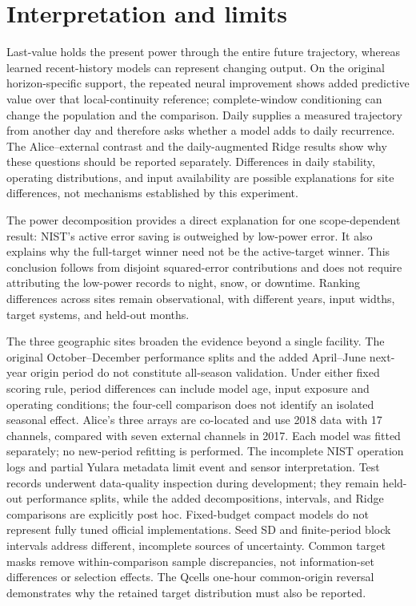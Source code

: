 \documentclass[aip,reprint,floatfix,amsmath,amssymb]{revtex4-2}
\begin{document}
\section{Interpretation and limits}
Last-value holds the present power through the entire future trajectory, whereas learned recent-history models can represent changing output. On the original horizon-specific support, the repeated neural improvement shows added predictive value over that local-continuity reference; complete-window conditioning can change the population and the comparison. Daily supplies a measured trajectory from another day and therefore asks whether a model adds to daily recurrence. The Alice--external contrast and the daily-augmented Ridge results show why these questions should be reported separately. Differences in daily stability, operating distributions, and input availability are possible explanations for site differences, not mechanisms established by this experiment.

The power decomposition provides a direct explanation for one scope-dependent result: NIST's active error saving is outweighed by low-power error. It also explains why the full-target winner need not be the active-target winner. This conclusion follows from disjoint squared-error contributions and does not require attributing the low-power records to night, snow, or downtime. Ranking differences across sites remain observational, with different years, input widths, target systems, and held-out months.

The three geographic sites broaden the evidence beyond a single facility. The original October--December performance splits and the added April--June next-year origin period do not constitute all-season validation. Under either fixed scoring rule, period differences can include model age, input exposure and operating conditions; the four-cell comparison does not identify an isolated seasonal effect. Alice's three arrays are co-located and use 2018 data with 17 channels, compared with seven external channels in 2017. Each model was fitted separately; no new-period refitting is performed. The incomplete NIST operation logs and partial Yulara metadata limit event and sensor interpretation. Test records underwent data-quality inspection during development; they remain held-out performance splits, while the added decompositions, intervals, and Ridge comparisons are explicitly post hoc. Fixed-budget compact models do not represent fully tuned official implementations. Seed SD and finite-period block intervals address different, incomplete sources of uncertainty. Common target masks remove within-comparison sample discrepancies, not information-set differences or selection effects. The Qcells one-hour common-origin reversal demonstrates why the retained target distribution must also be reported.
\end{document}
